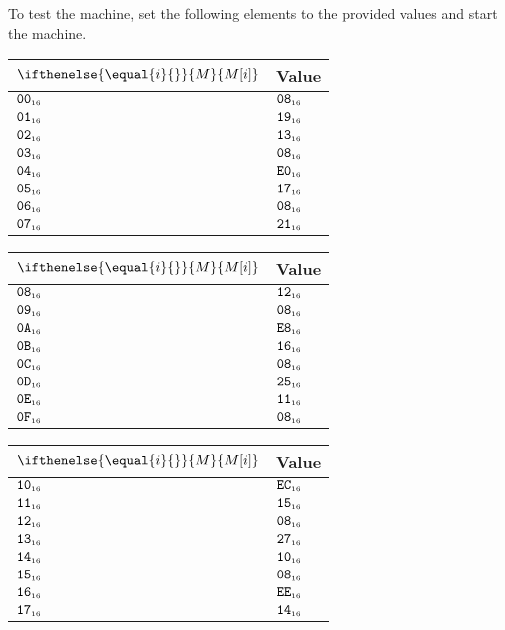 \documentclass[a4paper,12pt]{article}
\newcommand{\num}[1]{\texttt{#1}}
\newcommand{\hex}[1]{\num{#1}_{\textup{\tiny 16}}}
\newcommand{\MEM}[1]{\ifthenelse{\equal{#1}{}}{M}{M[#1]}}
\begin{document}
To test the machine, set the following elements to the provided values and start the machine.

\begin{center}
  \begin{tabular}{@{}ll@{}}
    \hline
    $\MEM{i}$  & Value \\
    \hline
    $\hex{00}$ & $\hex{08}$ \\
    $\hex{01}$ & $\hex{19}$ \\
    $\hex{02}$ & $\hex{13}$ \\
    $\hex{03}$ & $\hex{08}$ \\
    $\hex{04}$ & $\hex{E0}$ \\
    $\hex{05}$ & $\hex{17}$ \\
    $\hex{06}$ & $\hex{08}$ \\
    $\hex{07}$ & $\hex{21}$ \\
    \hline
  \end{tabular}
  \hfil
  \begin{tabular}{@{}ll@{}}
    \hline
    $\MEM{i}$  & Value \\
    \hline
    $\hex{08}$ & $\hex{12}$ \\
    $\hex{09}$ & $\hex{08}$ \\
    $\hex{0A}$ & $\hex{E8}$ \\
    $\hex{0B}$ & $\hex{16}$ \\
    $\hex{0C}$ & $\hex{08}$ \\
    $\hex{0D}$ & $\hex{25}$ \\
    $\hex{0E}$ & $\hex{11}$ \\
    $\hex{0F}$ & $\hex{08}$ \\
    \hline
  \end{tabular}
  \hfil
  \begin{tabular}{@{}ll@{}}
    \hline
    $\MEM{i}$  & Value \\
    \hline
    $\hex{10}$ & $\hex{EC}$ \\
    $\hex{11}$ & $\hex{15}$ \\
    $\hex{12}$ & $\hex{08}$ \\
    $\hex{13}$ & $\hex{27}$ \\
    $\hex{14}$ & $\hex{10}$ \\
    $\hex{15}$ & $\hex{08}$ \\
    $\hex{16}$ & $\hex{EE}$ \\
    $\hex{17}$ & $\hex{14}$ \\
    \hline
  \end{tabular}
  \hfil
  \begin{tabular}{@{}ll@{}}

\end{tabular}
\end{center}
\end{document}
